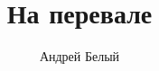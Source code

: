 \documentclass[12pt,a4paper,oneside]{book}
\begin{document}
\title{На перевале}
\author{Андрей Белый}
\date{}
\maketitle
\end{document}
